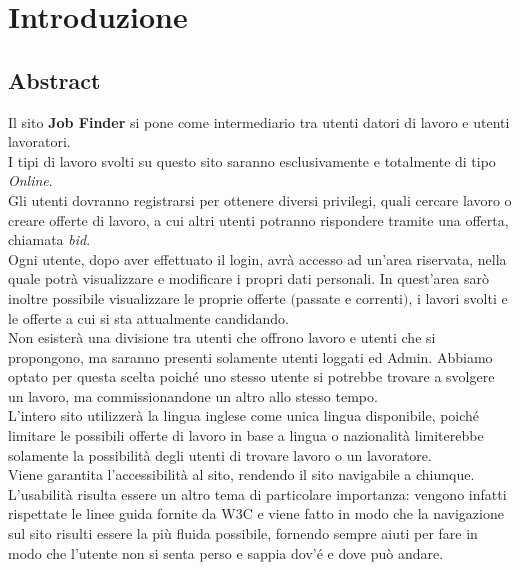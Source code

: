 \section{Introduzione}
	\subsection{Abstract}
	Il sito \textbf{Job Finder} si pone come intermediario tra utenti datori di lavoro e utenti lavoratori.\\
  I tipi di lavoro svolti su questo sito saranno esclusivamente e totalmente di tipo \textit{Online}. \\
	Gli utenti dovranno registrarsi per ottenere diversi privilegi, quali cercare lavoro o creare offerte di lavoro, a cui altri utenti potranno rispondere tramite una offerta, 
  chiamata \textit{bid}.\\
  Ogni utente, dopo aver effettuato il login, avrà accesso ad un'area riservata, nella quale potrà visualizzare e modificare i propri dati personali. In quest'area sarò inoltre 
  possibile visualizzare le proprie offerte $($passate e correnti$)$, i lavori svolti e le offerte a cui si sta attualmente candidando.\\
  Non esisterà una divisione tra utenti che offrono lavoro e utenti che si propongono, ma saranno presenti solamente utenti loggati ed Admin. Abbiamo optato per questa scelta poiché 
  uno stesso utente si potrebbe trovare a svolgere un lavoro, ma commissionandone un altro allo stesso tempo.\\
  L'intero sito utilizzerà la lingua inglese come unica lingua disponibile, poiché limitare le possibili offerte di lavoro in base a lingua o nazionalità limiterebbe solamente 
  la possibilità degli utenti di trovare lavoro o un lavoratore.\\
  Viene garantita l’accessibilità al sito, rendendo il sito navigabile a chiunque.\\
  L’usabilità risulta essere un altro tema di particolare importanza: vengono infatti rispettate le linee guida fornite da W3C e viene fatto in modo che la navigazione sul sito
  risulti essere la più fluida possibile, fornendo sempre aiuti per fare in modo che l’utente non si senta perso e sappia dov'é e dove può andare.
	